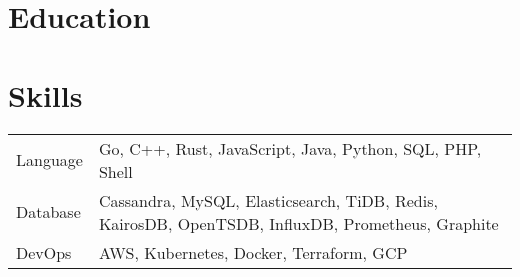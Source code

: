 \documentclass[11pt, letterpaper]{simple-cv}
\begin{document}




\section{Education}
{}

\section{Skills}
\begin{flushleft}
	\begin{tabular}{@{}ll@{}}
		Language  & Go, C++, Rust, JavaScript, Java, Python, SQL, PHP, Shell                                                  \\
		Database  & Cassandra, MySQL, Elasticsearch, TiDB, Redis, KairosDB, OpenTSDB, InfluxDB, Prometheus, Graphite \\
		DevOps    & AWS, Kubernetes, Docker, Terraform, GCP                                                         \\
	\end{tabular}
\end{flushleft}
\end{document}

